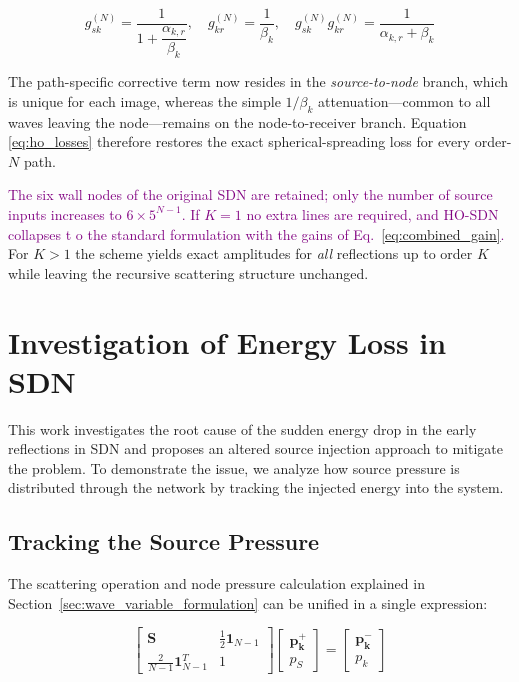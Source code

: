 \documentclass[journal]{IEEEtran}
\begin{document}
\begin{equation}\label{eq:ho_losses}
g_{s k}^{(N)} = \frac{1}{1 + \dfrac{\alpha_{k,r}}{\beta_k}},\quad
g_{k r}^{(N)} = \frac{1}{\beta_k},\quad
g_{s k}^{(N)} g_{k r}^{(N)} = \frac{1}{\alpha_{k,r} + \beta_k}
\end{equation}

The path-specific corrective term now resides in the
\emph{source-to-node} branch, which is unique for each image, whereas
the simple \(1/\beta_k\) attenuation—common to all waves leaving the
node—remains on the node-to-receiver branch.  Equation
\eqref{eq:ho_losses} therefore restores the exact spherical-spreading
loss for every order-\(N\) path.

\textcolor{purple}{
The six wall nodes of the original SDN are retained; only the
number of source inputs increases to \(6 \times 5^{N-1}\).
If \(K = 1\) no extra lines are required, and HO-SDN collapses t
o the
standard formulation with the gains of
Eq.~\eqref{eq:combined_gain}.
}
For \(K > 1\) the scheme yields exact
amplitudes for \emph{all} reflections up to order \(K\) while leaving
the recursive scattering structure unchanged.

\section{Investigation of Energy Loss in SDN}
\label{sec:energy_drop_problem}
This work investigates the root cause of the sudden energy drop in the early reflections in SDN and proposes an altered source injection approach to mitigate the problem.
To demonstrate the issue, we analyze how source pressure is distributed through the network by tracking the injected energy into the system.

\subsection{Tracking the Source Pressure}
\label{sec:pressure_distribution}

The scattering operation and node pressure calculation explained in 
Section~\ref{sec:wave_variable_formulation} can be unified in a single expression:

\begin{equation}
\label{eq:augmented_matrix}
\begin{bmatrix}
    \mathbf{S} & \frac{1}{2}\mathbf{1}_{N-1} \\
    \frac{2}{N-1}\mathbf{1}_{N-1}^T & 1
\end{bmatrix}
\begin{bmatrix}
\mathbf{p_k^+} \\
p_{S}
\end{bmatrix}
=
\begin{bmatrix}
\mathbf{p_k^-} \\
p_k
\end{bmatrix}
\end{equation}
\end{document}
